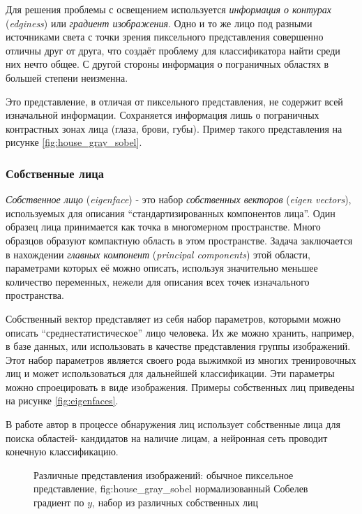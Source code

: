 \documentclass[12pt]{report}
\begin{document}
Для решения проблемы с освещением используется \emph{информация о контурах} (\textit{edginess}) или \emph{градиент 
изображения}. Одно и то же лицо под разными источниками света с точки зрения пиксельного представления совершенно 
отличны друг от друга, что создаёт проблему для классификатора найти среди них нечто общее. С другой стороны 
информация о пограничных областях в большей степени неизменна. \citep{ahmadyfard2008hierarchical}

Это представление, в отличая от пиксельного представления, не содержит всей изначальной информации. Сохраняется 
информация лишь о пограничных контрастных зонах лица (глаза, брови, губы). Пример такого представления на рисунке 
\ref{fig:house_gray_sobel}.

\subsubsection{Собственные лица}
\emph{Собственное лицо} (\textit{eigenface}) - это набор \emph{собственных векторов} (\textit{eigen vectors}), 
используемых для описания ``стандартизированных  компонентов лица''. Один образец лица принимается как точка в 
многомерном пространстве. Много образцов образуют компактную область в этом пространстве. Задача заключается в 
нахождении 
\emph{главных компонент} (\textit{principal components}) этой области, параметрами которых её можно описать, 
используя значительно меньшее количество переменных, нежели для описания всех точек изначального пространства.
\citep{turk1991eigenfaces}

Собственный вектор представляет из себя набор параметров, которыми можно описать ``среднестатистическое'' лицо 
человека. Их же можно хранить, например, в базе данных, или использовать в качестве представления группы 
изображений. Этот набор параметров является своего рода выжимкой из многих тренировочных лиц и может использоваться 
для дальнейшей классификации. Эти параметры можно спроецировать в виде изображения. Примеры собственных лиц 
приведены на рисунке \ref{fig:eigenfaces}.

В работе \citep{tsai2006face} автор в процессе обнаружения лиц использует собственные лица для поиска областей-
кандидатов на наличие лицам, а нейронная сеть проводит конечную классификацию.

\begin{figure}[h]
	\centering
	\caption{Различные представления изображений:  обычное пиксельное представление, \subref
{fig:house_gray_sobel} нормализованный Собелев градиент по $y$,  набор из различных 
собственных лиц}
	\label{fig:representations}
\end{figure}
\end{document}
